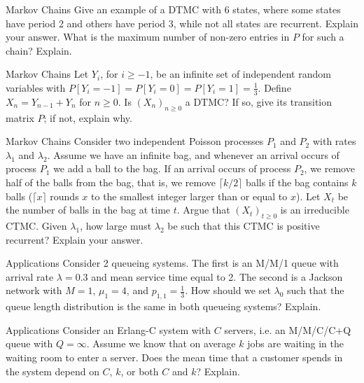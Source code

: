 \begin{problem}{Markov Chains}
Give an example of a DTMC with 6 states, where some states have period 2 and others have period 3, while not all states are recurrent. Explain your answer. What is the maximum number of non-zero entries in \( P \) for such a chain? Explain.
\end{problem}

\begin{problem}{Markov Chains}
Let \( Y_i \), for \( i \geq -1 \), be an infinite set of independent random variables with \( P [Y_i = -1] = P [Y_i = 0] = P [Y_i = 1] = \frac{1}{3} \). Define \( X_n = Y_{n-1} + Y_n \) for \( n \geq 0 \). Is \( (X_n)_{n \geq 0} \) a DTMC? If so, give its transition matrix \( P \); if not, explain why.
\end{problem}

\begin{problem}{Markov Chains}
Consider two independent Poisson processes \( P_1 \) and \( P_2 \) with rates \( \lambda_1 \) and \( \lambda_2 \). Assume we have an infinite bag, and whenever an arrival occurs of process \( P_1 \) we add a ball to the bag. If an arrival occurs of process \( P_2 \), we remove half of the balls from the bag, that is, we remove \( \lceil k/2 \rceil \) balls if the bag contains \( k \) balls (\( \lceil x \rceil \) rounds \( x \) to the smallest integer larger than or equal to \( x \)). Let \( X_t \) be the number of balls in the bag at time \( t \). Argue that \( (X_t)_{t \geq 0} \) is an irreducible CTMC. Given \( \lambda_1 \), how large must \( \lambda_2 \) be such that this CTMC is positive recurrent? Explain your answer.
\end{problem}

\begin{problem}{Applications}
Consider 2 queueing systems. The first is an M/M/1 queue with arrival rate \( \lambda = 0.3 \) and mean service time equal to 2. The second is a Jackson network with \( M = 1 \), \( \mu_1 = 4 \), and \( p_{1,1} = \frac{1}{3} \). How should we set \( \lambda_0 \) such that the queue length distribution is the same in both queueing systems? Explain.
\end{problem}

\begin{problem}{Applications}
Consider an Erlang-C system with \( C \) servers, i.e. an M/M/C/C+Q queue with \( Q = \infty \). Assume we know that on average \( k \) jobs are waiting in the waiting room to enter a server. Does the mean time that a customer spends in the system depend on \( C \), \( k \), or both \( C \) and \( k \)? Explain.
\end{problem}